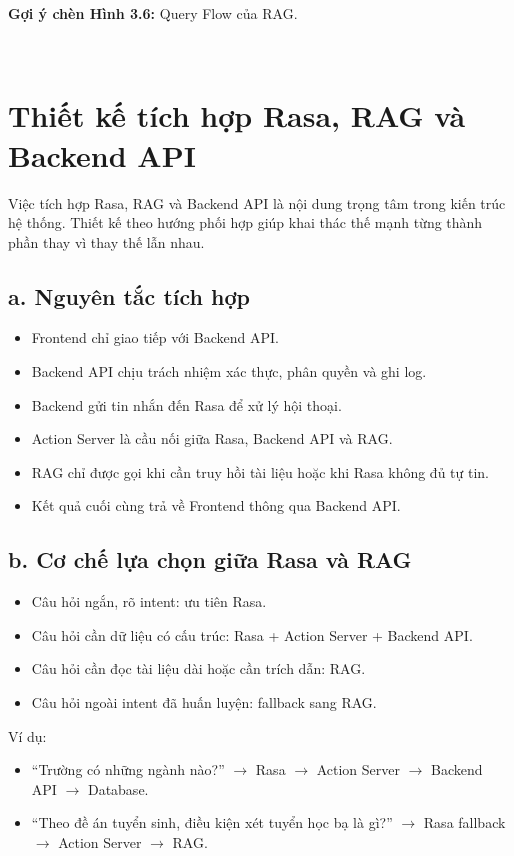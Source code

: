 \documentclass[12pt,a4paper]{report}
\begin{document}
\textbf{Gợi ý chèn Hình 3.6:} Query Flow của RAG.

﻿\section{Thiết kế tích hợp Rasa, RAG và Backend API}

Việc tích hợp Rasa, RAG và Backend API là nội dung trọng tâm trong kiến trúc hệ thống. Thiết kế theo hướng phối hợp giúp khai thác thế mạnh từng thành phần thay vì thay thế lẫn nhau.

\subsection*{a. Nguyên tắc tích hợp}

\begin{itemize}
    \item Frontend chỉ giao tiếp với Backend API.
    \item Backend API chịu trách nhiệm xác thực, phân quyền và ghi log.
    \item Backend gửi tin nhắn đến Rasa để xử lý hội thoại.
    \item Action Server là cầu nối giữa Rasa, Backend API và RAG.
    \item RAG chỉ được gọi khi cần truy hồi tài liệu hoặc khi Rasa không đủ tự tin.
    \item Kết quả cuối cùng trả về Frontend thông qua Backend API.
\end{itemize}

\subsection*{b. Cơ chế lựa chọn giữa Rasa và RAG}

\begin{itemize}
    \item Câu hỏi ngắn, rõ intent: ưu tiên Rasa.
    \item Câu hỏi cần dữ liệu có cấu trúc: Rasa + Action Server + Backend API.
    \item Câu hỏi cần đọc tài liệu dài hoặc cần trích dẫn: RAG.
    \item Câu hỏi ngoài intent đã huấn luyện: fallback sang RAG.
\end{itemize}

Ví dụ:
\begin{itemize}
    \item ``Trường có những ngành nào?'' $\rightarrow$ Rasa $\rightarrow$ Action Server $\rightarrow$ Backend API $\rightarrow$ Database.
    \item ``Theo đề án tuyển sinh, điều kiện xét tuyển học bạ là gì?'' $\rightarrow$ Rasa fallback $\rightarrow$ Action Server $\rightarrow$ RAG.
\end{itemize}
\end{document}
